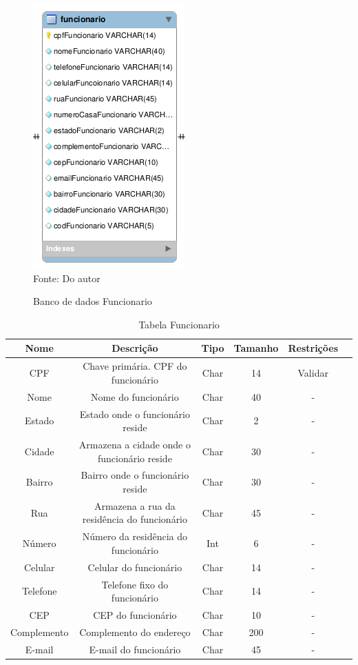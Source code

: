 
\begin{figure}[H]
	\centering 
	\caption{Banco de dados Funcionario}
	\label{banco_de_dados}
	\includegraphics[scale = 0.8]{imagens/bd-func.png}
	\\Fonte: Do autor
\end{figure}


\begin{table}[H]
\caption{Tabela Funcionario}
\begin{center}
\begin{tabular}{|c|c|c|c|c|c|}
\hline
Nome & Descrição & Tipo & Tamanho & Restrições \\ \hline
CPF & Chave primária. CPF do funcionário & Char & 14 & Validar \\ \hline
Nome & Nome do funcionário & Char & 40 & - \\ \hline
Estado & Estado onde o funcionário reside & Char & 2 & - \\ \hline
Cidade & Armazena a cidade onde o funcionário reside & Char & 30 & - \\ \hline
Bairro & Bairro onde o funcionário reside & Char & 30 & - \\ \hline
Rua & Armazena a rua da residência do funcionário & Char & 45 & - \\ \hline
Número & Número da residência do funcionário & Int & 6 & - \\ \hline
Celular & Celular do funcionário & Char & 14 & - \\ \hline
Telefone & Telefone fixo do funcionário & Char & 14 & - \\ \hline
CEP & CEP do funcionário & Char & 10 & - \\ \hline
Complemento & Complemento do endereço & Char & 200 & - \\ \hline
E-mail & E-mail do funcionário & Char & 45 & - \\ \hline
\end{tabular}
\end{center}
\label{tabela_funcionario}
\end{table}




